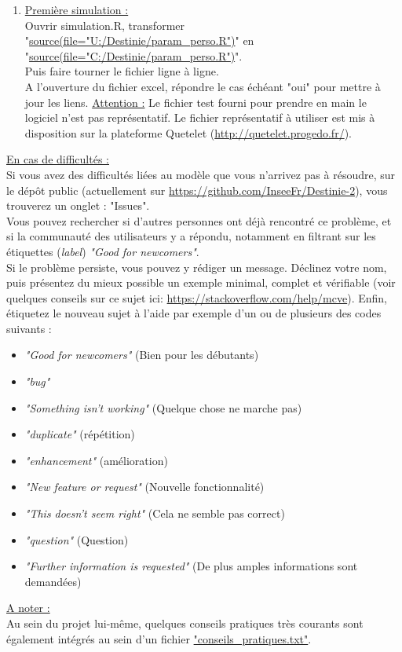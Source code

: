 \begin{enumerate}
\item \underline{Première simulation :}\\
Ouvrir simulation.R, transformer "\url{source(file="U:/Destinie/param_perso.R")}" en "\url{source(file="C:/Destinie/param_perso.R")}".\\
Puis faire tourner le fichier ligne à ligne.\\
A l'ouverture du fichier excel, répondre le cas échéant "oui" pour mettre à jour les liens.
\underline{Attention :} Le fichier test fourni pour prendre en main le logiciel n'est pas représentatif. Le fichier représentatif à utiliser est mis à disposition sur la plateforme Quetelet (\url{http://quetelet.progedo.fr/}).\\


\end{enumerate}

\underline{En cas de difficultés :}\\
Si vous avez des difficultés liées au modèle que vous n'arrivez pas à résoudre, sur le dépôt public (actuellement sur \url{https://github.com/InseeFr/Destinie-2}), vous trouverez un onglet : "Issues".\\
Vous pouvez rechercher si d'autres personnes ont déjà rencontré ce problème, et si la communauté des utilisateurs y a répondu, notamment en filtrant sur les étiquettes (\textit{label}) \textit{"Good for newcomers"}.\\
Si le problème persiste, vous pouvez y rédiger un message. Déclinez votre nom, puis présentez du mieux possible un exemple minimal, complet et vérifiable (voir quelques conseils sur ce sujet ici: \url{https://stackoverflow.com/help/mcve}). Enfin, étiquetez le nouveau sujet à l'aide par exemple d'un ou de plusieurs des codes suivants :
\begin{itemize}
\item \textit{"Good for newcomers"} (Bien pour les débutants)
\item \textit{"bug"}
\item \textit{"Something isn't working"} (Quelque chose ne marche pas)
\item \textit{"duplicate"} (répétition)
\item \textit{"enhancement"} (amélioration)
\item \textit{"New feature or request"} (Nouvelle fonctionnalité)
\item \textit{"This doesn't seem right"} (Cela ne semble pas correct)
\item \textit{"question"} (Question)
\item \textit{"Further information is requested"} (De plus amples informations sont demandées)\\
\end{itemize}


\underline{A noter :}\\
Au sein du projet lui-même, quelques conseils pratiques très courants sont également intégrés au sein d'un fichier \url{"conseils_pratiques.txt"}.